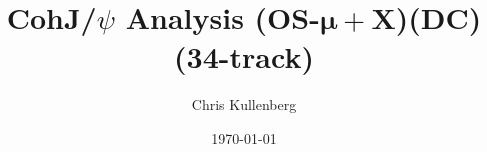 \title{CohJ/$\psi$ Analysis (\textbf{OS}-$\boldsymbol{\mu+}$\textbf{X})(\textbf{DC})(\textbf{34-track})}
\author{Chris Kullenberg}
\date{\today}
